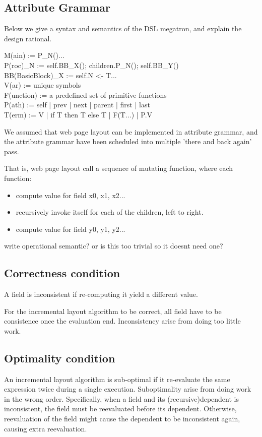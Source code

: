 \documentclass[format=acmsmall, review=false, screen=true]{acmart}
\begin{document}
\subsection{Attribute Grammar}
Below we give a syntax and semantics of the DSL megatron, and explain the design rational.

M(ain) := P\_N()... \\
P(roc)\_N := self.BB\_X(); children.P\_N(); self.BB\_Y() \\
BB(BasicBlock)\_X := self.N <- T... \\
V(ar) := unique symbols \\
F(unction) := a predefined set of primitive functions \\
P(ath) := self | prev | next | parent | first | last \\
T(erm) := V | if T then T else T | F(T...) | P.V

We assumed that web page layout can be implemented in attribute grammar, and the attribute grammar have been scheduled into multiple 'there and back again' pass.

That is, web page layout call a sequence of mutating function, where each function:
\begin{itemize}
	\item compute value for field x0, x1, x2...
	\item recursively invoke itself for each of the children, left to right.
	\item compute value for field y0, y1, y2...
\end{itemize}

write operational semantic? or is this too trivial so it doesnt need one?

\subsection{Correctness condition}
A field is inconsistent if re-computing it yield a different value.

For the incremental layout algorithm to be correct, all field have to be consistence once the evaluation end. Inconsistency arise from doing too little work.

\subsection{Optimality condition}
An incremental layout algorithm is sub-optimal if it re-evaluate the same expression twice during a single execution. Suboptimality arise from doing work in the wrong order. Specifically, when a field and its (recursive)dependent is inconsistent, the field must be reevaluated before its dependent. Otherwise, reevaluation of the field might cause the dependent to be inconsistent again, causing extra reevaluation.
\end{document}
